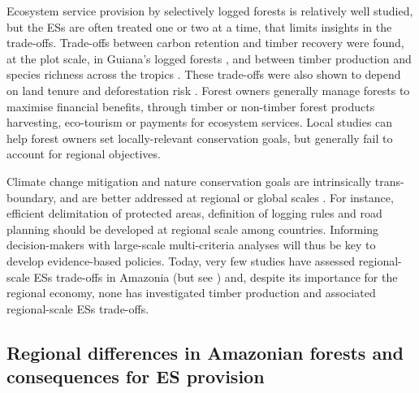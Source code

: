 \documentclass{article}
\begin{document}
Ecosystem service provision by selectively logged forests is relatively well studied, but the ESs are often treated one or two at a time, that limits insights in the trade-offs. Trade-offs between carbon retention and timber recovery were found, at the plot scale, in Guiana's logged forests \cite{Roopsind2018}, and between timber production and species richness across the tropics \cite{Burivalova2014}. These trade-offs were also shown to depend on land tenure and deforestation risk \cite{Griscom2018}. Forest owners generally manage forests to maximise financial benefits, through timber or non-timber forest products harvesting, eco-tourism or payments for ecosystem services. Local studies can help forest owners set locally-relevant conservation goals, but generally fail to account for regional objectives.

Climate change mitigation and nature conservation goals are intrinsically trans-boundary, and are better addressed at regional or global scales \cite{Hein2006}. For instance, efficient delimitation of protected areas, definition of logging rules and road planning should be developed at regional scale among countries. Informing decision-makers with large-scale multi-criteria analyses will thus be key to develop evidence-based policies. Today, very few studies have assessed regional-scale ESs trade-offs in Amazonia (but see \cite{OConnell2018}) and, despite its importance for the regional economy, none has investigated timber production and associated regional-scale ESs trade-offs.

\subsection{Regional differences in Amazonian forests and consequences for ES provision}
            	
\end{document}
